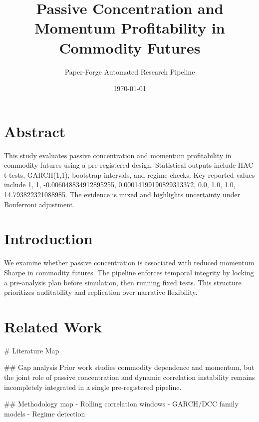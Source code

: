 \documentclass[11pt]{article}
\begin{document}
\title{Passive Concentration and Momentum Profitability in Commodity Futures}
\author{Paper-Forge Automated Research Pipeline}
\date{\today}
\maketitle
\section{Abstract}
This study evaluates passive concentration and momentum profitability in commodity futures using a pre-registered design. Statistical outputs include HAC t-tests, GARCH(1,1), bootstrap intervals, and regime checks. Key reported values include 1, 1, -0.006048834912895255, 0.00014199190829313372, 0.0, 1.0, 1.0, 14.793822321088985. The evidence is mixed and highlights uncertainty under Bonferroni adjustment.

\section{Introduction}
We examine whether passive concentration is associated with reduced momentum Sharpe in commodity futures. The pipeline enforces temporal integrity by locking a pre-analysis plan before simulation, then running fixed tests. This structure prioritizes auditability and replication over narrative flexibility.

\section{Related Work}
# Literature Map

## Gap analysis
Prior work studies commodity dependence and momentum, but the joint role of passive concentration and dynamic correlation instability remains incompletely integrated in a single pre-registered pipeline.

## Methodology map
- Rolling correlation windows
- GARCH/DCC family models
- Regime detection
\end{document}
